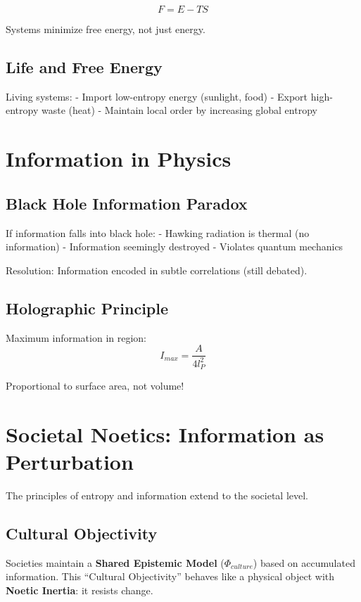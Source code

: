 \documentclass[
  11pt,
  letterpaper,
  twoside,
  openright]{book}
\begin{document}
\[
F = E - TS
\]

Systems minimize free energy, not just energy.

\subsection{Life and Free Energy}\label{life-and-free-energy}

Living systems: - Import low-entropy energy (sunlight, food) - Export
high-entropy waste (heat) - Maintain local order by increasing global
entropy

\section{Information in Physics}\label{information-in-physics}

\subsection{Black Hole Information
Paradox}\label{black-hole-information-paradox}

If information falls into black hole: - Hawking radiation is thermal (no
information) - Information seemingly destroyed - Violates quantum
mechanics

Resolution: Information encoded in subtle correlations (still debated).

\subsection{Holographic Principle}\label{holographic-principle}

Maximum information in region: \[
I_{max} = \frac{A}{4 l_P^2}
\]

Proportional to surface area, not volume!

\section{Societal Noetics: Information as
Perturbation}\label{societal-noetics-information-as-perturbation}

The principles of entropy and information extend to the societal level.

\subsection{Cultural Objectivity}\label{cultural-objectivity}

Societies maintain a \textbf{Shared Epistemic Model}
(\(\Phi_{culture}\)) based on accumulated information. This ``Cultural
Objectivity'' behaves like a physical object with \textbf{Noetic
Inertia}: it resists change.
\end{document}
